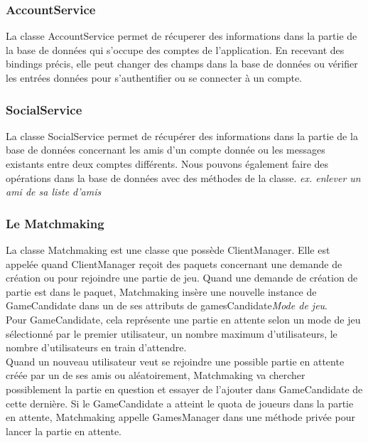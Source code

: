 \documentclass{article}
\begin{document}
\subsubsection*{AccountService}

La classe AccountService permet de récuperer des informations dans la partie de la base de données qui s'occupe des comptes de l'application. En recevant des bindings précis, elle peut changer des champs dans la base de données ou vérifier les entrées données pour s'authentifier ou se connecter à un compte. 

\subsubsection*{SocialService}

La classe SocialService permet de récupérer des informations dans la partie de la base de données concernant les amis d'un compte donnée ou les messages existants entre deux comptes différents. Nous pouvons également faire des opérations dans la base de données avec des méthodes de la classe. \textit{ex. enlever un ami de sa liste d'amis}

\subsubsection{Le Matchmaking}
La classe Matchmaking est une classe que possède ClientManager. Elle est appelée quand ClientManager reçoit des paquets concernant une demande de création ou pour rejoindre une partie de jeu. Quand une demande de création de partie est dans le paquet, Matchmaking insère une nouvelle instance de GameCandidate dans un de ses attributs de gamesCandidate\textit{Mode de jeu}.\\
Pour GameCandidate, cela représente une partie en attente selon un mode de jeu sélectionné par le premier utilisateur, un nombre maximum d'utilisateurs, le nombre d'utilisateurs en train d'attendre. \\
Quand un nouveau utilisateur veut se rejoindre une possible partie en attente créée par un de ses amis ou aléatoirement, Matchmaking va chercher possiblement la partie en question et essayer de l'ajouter dans GameCandidate de cette dernière. Si le GameCandidate a atteint le quota de joueurs dans la partie en attente, Matchmaking appelle GamesManager dans une méthode privée pour lancer la partie en attente. 
\end{document}
